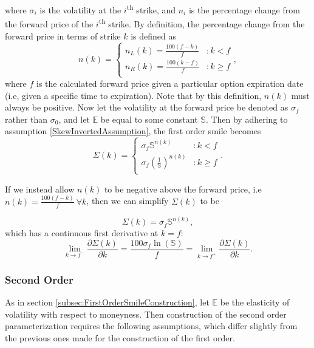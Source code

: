 \documentclass[12pt, a4paper, notitlepage]{article}
\numberwithin{equation}{subsection}
\numberwithin{figure}{subsection}
\numberwithin{table}{subsection}
\newcommand{\newpar}{\newline \newline}
\begin{document}
where $\sigma_i$ is the volatility at the $i$\textsuperscript{th} strike, and $n_i$ is the percentage change from the forward price of the $i$\textsuperscript{th} strike.  By definition, the percentage change from the forward price in terms of strike $k$ is defined as
\begin{equation*}
n(k) = 	\begin{cases}
			n_L(k) = \frac{100\left(f-k\right)}{f} & : k < f\\
            n_R(k) = \frac{100\left(k-f\right)}{f} & : k \geq f\\
		\end{cases},
\end{equation*}
where $f$ is the calculated forward price given a particular option expiration date (i.e, given a specific time to expiration).  Note that by this definition, $n(k)$ must always be positive.
\newpar
Now let the volatility at the forward price be denoted as $\sigma_f$ rather than $\sigma_0$, and let $\mathbb{E}$ be equal to some constant $\mathbb{S}$.  Then by adhering to assumption \ref{SkewInvertedAssumption}, the first order smile becomes
\begin{equation*}
\Sigma(k) = \begin{cases}
			\sigma_f\mathbb{S}^{n(k)} & : k < f\\
            \sigma_f\left(\frac{1}{\mathbb{S}}\right)^{n(k)} & : k \geq f\\
        \end{cases}.
\end{equation*}

If we instead allow $n(k)$ to be negative above the forward price, i.e $n(k) = \frac{100\left(f-k\right)}{f} \ \forall k$, then we can simplify $\Sigma(k)$ to be

\begin{equation*}
	\Sigma(k) = \sigma_f\mathbb{S}^{n(k)},
\end{equation*}
which has a continuous first derivative at $k=f$:
\begin{equation*}
    \lim_{k\to f^-}\frac{\partial \Sigma(k)}{\partial k} = \frac{100\sigma_f\ln(\mathbb{S})}{f} = \lim_{k\to f^+}\frac{\partial \Sigma(k)}{\partial k}.
\end{equation*}

\subsubsection{Second Order}
As in section \ref{subsec:FirstOrderSmileConstruction}, let $\mathbb{E}$ be the elasticity of volatility with respect to moneyness.  Then construction of the second order parameterization requires the following assumptions, which differ slightly from the previous ones made for the construction of the first order.
\end{document}

